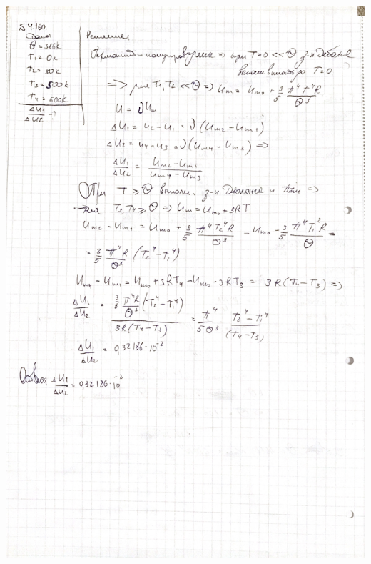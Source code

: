 \documentclass[12pt]{article}
\begin{document}
\begin{center}
\includegraphics[scale=0.2]{7_2.jpeg}\\
\end{center}
\end{document}
